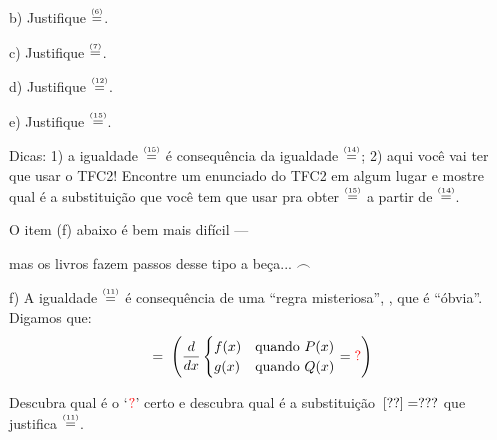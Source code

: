 \documentclass[oneside,12pt]{article}
\begin{document}
{{b) Justifique $\overset{\scriptscriptstyle(6)}{=}$.

c) Justifique $\overset{\scriptscriptstyle(7)}{=}$.

d) Justifique $\overset{\scriptscriptstyle(12)}{=}$.

\ssk

e) Justifique $\overset{\scriptscriptstyle(15)}{=}$.

Dicas: 1) a igualdade $\overset{\scriptscriptstyle(15)}{=}$ é consequência da igualdade
$\overset{\scriptscriptstyle(14)}{=}$; 2) aqui você vai ter que usar o TFC2! Encontre um
enunciado do TFC2 em algum lugar e mostre qual é a substituição que
você tem que usar pra obter $\overset{\scriptscriptstyle(15)}{=}$ a partir de
$\overset{\scriptscriptstyle(14)}{=}$.

\bsk


O item (f) abaixo é bem mais difícil ---

mas os livros fazem passos desse tipo a beça... $\frown$

\ssk

f) A igualdade $\overset{\scriptscriptstyle(11)}{=}$ é consequência de uma
``regra misteriosa'', , que é ``óbvia''. Digamos que:
%
$$\ga{RM} \; = \;
  \left(\ddx
    \begin{cases}
      f(x) & \text{quando $P(x)$} \\
      g(x) & \text{quando $Q(x)$} \\
    \end{cases}
    = \rq
  \right)
$$

Descubra qual é o `$\rq$' certo e descubra qual é a substituição
$\ga{RM}\,[??] = ???$ que justifica $\overset{\scriptscriptstyle(11)}{=}$.



}}


\newpage

\end{document}
